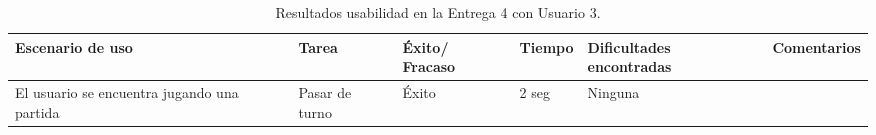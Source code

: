 \begin{table}[h]
  \begin{center}
    \begin{tabular}{|p{2.5cm}|p{1.75cm}|p{1.25cm}|p{1.25cm}|p{2.75cm}|p{3.5cm}|}

      \hline
        \rowcolor{Gray} \textbf{Escenario de uso}
        & \textbf{Tarea}
        & \textbf{Éxito/ Fracaso}
        & \textbf{Tiempo}
        & \textbf{Dificultades encontradas}
        & \textbf{Comentarios}\\

        \hline
        El usuario se encuentra jugando una partida
        & Pasar de turno
        & Éxito
        & 2 seg
        & Ninguna
        &\\

      \hline

    \end{tabular}

    \caption{Resultados usabilidad en la Entrega 4 con Usuario 3.}
    \label{tabla-entrega-4-usuario3}

  \end{center}
\end{table}
